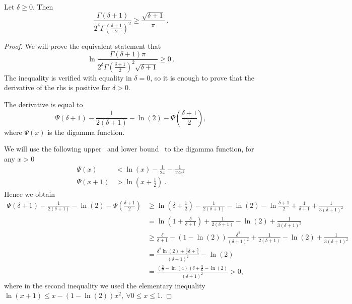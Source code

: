 \begin{lemma}
\label{lemma:ratio_gamma}
Let $\delta \geq 0$. Then
\[
\frac{\Gamma(\delta+1)}{2^\delta \Gamma(\frac{\delta+1}{2})^2} 
\geq \frac{\sqrt{\delta+1}}{\pi}~.
\]
\end{lemma}
%
\begin{proof}
We will prove the equivalent statement that
\[
\ln \frac{\Gamma(\delta+1) \pi}{2^\delta \Gamma(\frac{\delta+1}{2})^2 \sqrt{\delta+1}} \geq 0~.
\]
The inequality is verified with equality in $\delta=0$, so it is enough to prove that the derivative of the rhs is positive for $\delta>0$.

The derivative is equal to
\[
\Psi(\delta+1) - \frac{1}{2(\delta+1)} -\ln(2) -\Psi(\frac{\delta+1}{2}),
\]
where $\Psi(x)$ is the digamma function.

We will use the following upper~\citep{Chen05} and lower bound~\citep{Batir08} to the digamma function, for any $x>0$
\begin{align*}
\Psi(x) &< \ln(x) -\frac{1}{2x} -\frac{1}{12 x^2}\\
\Psi(x+1) &> \ln(x+\frac{1}{2})~.
\end{align*}
Hence we obtain
\begin{align*}
\Psi(\delta+1) - \frac{1}{2(\delta+1)} -\ln(2) -\Psi(\frac{\delta+1}{2})
&\geq \ln(\delta+\frac{1}{2})- \frac{1}{2(\delta+1)} -\ln(2) -\ln\frac{\delta+1}{2} +\frac{1}{\delta+1} +\frac{1}{3 (\delta+1)^2} \\
&= \ln(1+\frac{\delta}{\delta+1})+ \frac{1}{2(\delta+1)} -\ln(2)+\frac{1}{3 (\delta+1)^2} \\
&\geq \frac{\delta}{\delta+1} - (1-\ln(2))\frac{\delta^2}{(\delta+1)^2}+ \frac{1}{2(\delta+1)} -\ln(2)+\frac{1}{3 (\delta+1)^2}\\
&= \frac{\delta^2 \ln(2)+\frac{3}{2}\delta +\frac{5}{6}}{(\delta+1)^2} - \ln(2)\\
&= \frac{(\frac{3}{2}-\ln(4)) \delta +\frac{5}{6}-\ln(2)}{(\delta+1)^2} >0,
\end{align*}
where in the second inequality we used the elementary inequality $\ln(x+1) \leq x - (1-\ln(2))x^2, \ \forall 0\leq x \leq 1$.
\end{proof}

